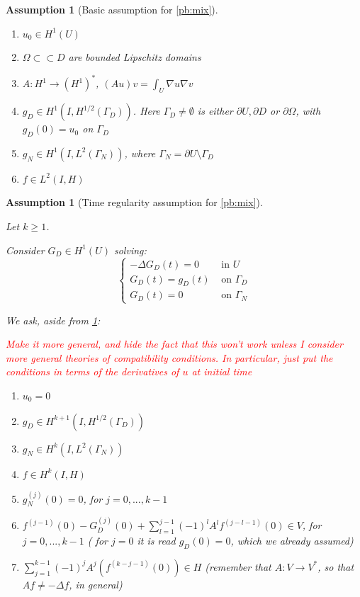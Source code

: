 \documentclass[english,a4paper,9pt,oneside]{scrbook}	%
\theoremstyle{break}
\newtheorem{ass}[equation]{Assumption}
\theoremstyle{remark}
\newcommand{\cc}{\subset\subset}
\begin{document}
\begin{appendices}
\begin{ass}[Basic assumption for \cref{pb:mix}]
\label{ass:basic_par_mix}
\textcolor{white}{ }
\begin{enumerate}
	\item $u_0 \in H^1(U)$
	\item $\Omega \cc D$ are bounded Lipschitz domains
	\item $A: H^1 \rightarrow (H^1)^*$, $(Au)v = \int_U \nabla u \nabla v$
	\item $g_D \in H^1(I, H^{1/2}(\Gamma_D))$. Here $\Gamma_D\neq \emptyset$ is either $\partial U, \partial D $ or $\partial \Omega$, with $g_D(0) = u_0$ on $\Gamma_D$
	\item $g_N \in H^1(I, L^2(\Gamma_N))$, where $\Gamma_N = \partial U \setminus \Gamma_D$
	\item $f \in L^2(I, H)$
\end{enumerate}
\end{ass}

\begin{ass}[Time regularity assumption for \cref{pb:mix}]
\label{ass:time_reg_mix}

Let $k\geq 1$. 

Consider $G_D \in H^1(U)$ solving:
$$
\left\{\begin{matrix}
-\Delta G_D(t) = 0 & \text{ in } U\\ 
G_D(t) = g_D(t) & \text{ on } \Gamma_D\\ 
G_D(t) = 0 & \text{ on } \Gamma_N 
\end{matrix}\right.
$$

We ask, aside from \cref{ass:basic_par_mix}:

\textcolor{red}{Make it more general, and hide the fact that this won't work unless I consider more general theories of compatibility conditions. In particular, just put the conditions in terms of the derivatives of $u$ at initial time}

\begin{enumerate}
	\item $u_0=0$
	\item $g_D \in H^{k+1}(I, H^{1/2}(\Gamma_D))$
	\item $g_N \in H^{k}(I, L^2(\Gamma_N))$
	\item $f \in H^k(I, H)$
	\item $g_N^{(j)}(0)=0$, for $j = 0,...,k-1$
	\item $f^{(j-1)}(0) - G_D^{(j)}(0) + \sum_{l=1}^{j-1}(-1)^l A^l f^{(j-l-1)}(0)  \in V$, for $j=0,...,k-1$ ( for $j=0$ it is read $g_D(0)=0$, which we already assumed)
	\item $\sum_{j=1}^{k-1}(-1)^jA^j(f^{(k-j-1)}(0))\in H$ (remember that $A: V\rightarrow V^*$, so that $Af \neq -\Delta f$, in general)
\end{enumerate}
\end{ass}


\end{appendices}
\end{document}
